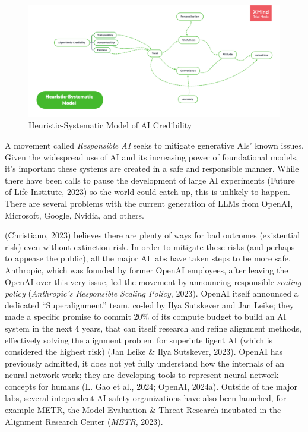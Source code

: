\documentclass[
  12pt,
  letterpaper,
  DIV=11,
  numbers=noendperiod]{scrartcl}
\begin{document}
\begin{figure}[H]

{\centering \includegraphics[width=1\linewidth,height=\textheight,keepaspectratio]{./images/ai/ai-credibility.png}

}

\caption{Heuristic-Systematic Model of AI Credibility}

\end{figure}%

A movement called \emph{Responsible AI} seeks to mitigate generative
AIs' known issues. Given the widespread use of AI and its increasing
power of foundational models, it's important these systems are created
in a safe and responsible manner. While there have been calls to pause
the development of large AI experiments (Future of Life Institute, 2023)
so the world could catch up, this is unlikely to happen. There are
several problems with the current generation of LLMs from OpenAI,
Microsoft, Google, Nvidia, and others.

(Christiano, 2023) believes there are plenty of ways for bad outcomes
(existential risk) even without extinction risk. In order to mitigate
these risks (and perhaps to appease the public), all the major AI labs
have taken steps to be more safe. Anthropic, which was founded by former
OpenAI employees, after leaving the OpenAI over this very issue, led the
movement by announcing responsible \emph{scaling policy}
(\emph{Anthropic's {Responsible Scaling Policy}}, 2023). OpenAI itself
announced a dedicated ``Superalignment'' team, co-led by Ilya Sutskever
and Jan Leike; they made a specific promise to commit 20\% of its
compute budget to build an AI system in the next 4 years, that can
itself research and refine alignment methods, effectively solving the
alignment problem for superintelligent AI (which is considered the
highest risk) (Jan Leike \& Ilya Sutskever, 2023). OpenAI has previously
admitted, it does not yet fully understand how the internals of an
neural network work; they are developing tools to represent neural
network concepts for humans (L. Gao et al., 2024; OpenAI, 2024a).
Outside of the major labs, several intependent AI safety organizations
have also been launched, for example METR, the Model Evaluation \&
Threat Research incubated in the Alignment Research Center
(\emph{{METR}}, 2023).
\end{document}
